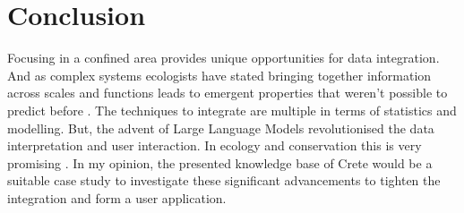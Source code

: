 \section{Conclusion}

Focusing in a confined area provides unique opportunities for data integration.
And as complex systems ecologists have stated bringing together information across
scales \parencite{brown2004METABOLIC} and functions leads to emergent properties that weren't possible to 
predict before \parencite{smith2016Origin}. The techniques to integrate are multiple in terms of statistics and modelling. But,
the advent of Large Language Models revolutionised the data interpretation and 
user interaction. In ecology and conservation this is very promising \parencite{doi2024biodiversity}.
In my opinion, the presented knowledge base of Crete would be a suitable 
case study to investigate these significant advancements to tighten the integration and form a 
user application.

